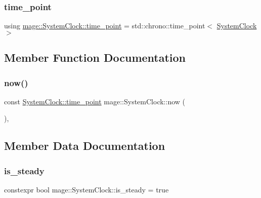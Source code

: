 \mbox{\label{structmage_1_1_system_clock_a00c052d5e1349785a6847fbfb9e1f044}} 
\subsubsection{\texorpdfstring{time\+\_\+point}{time\_point}}
{\footnotesize\ttfamily using \mbox{\hyperlink{structmage_1_1_system_clock_a00c052d5e1349785a6847fbfb9e1f044}{mage\+::\+System\+Clock\+::time\+\_\+point}} =  std\+::chrono\+::time\+\_\+point$<$ \mbox{\hyperlink{structmage_1_1_system_clock}{System\+Clock}} $>$}



\subsection{Member Function Documentation}
\mbox{\label{structmage_1_1_system_clock_a581ad90223253218d61c5d6c32da112a}} 
\subsubsection{\texorpdfstring{now()}{now()}}
{\footnotesize\ttfamily const \mbox{\hyperlink{structmage_1_1_system_clock_a00c052d5e1349785a6847fbfb9e1f044}{System\+Clock\+::time\+\_\+point}} mage\+::\+System\+Clock\+::now (\begin{DoxyParamCaption}{ }\end{DoxyParamCaption})\hspace{0.3cm}{\ttfamily [static]}, {\ttfamily [noexcept]}}



\subsection{Member Data Documentation}
\mbox{\label{structmage_1_1_system_clock_ad7cdec95a6032ab973ed02da26ddd3f0}} 
\subsubsection{\texorpdfstring{is\+\_\+steady}{is\_steady}}
{\footnotesize\ttfamily constexpr bool mage\+::\+System\+Clock\+::is\+\_\+steady = true\hspace{0.3cm}{\ttfamily [static]}}

